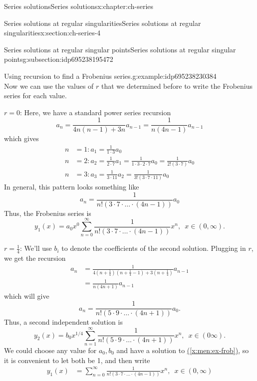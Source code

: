 \documentclass[oneside,10pt,]{book}
\newcommand{\xreffont}{\relax}
\numberwithin{equation}{section}
\numberwithin{equation}{section}
\newcommand{\amp}{&}
\begin{document}
\begin{chapterptx}{Series solutions}{}{Series solutions}{}{}{x:chapter:ch-series}
\begin{sectionptx}{Series solutions at regular singularities}{}{Series solutions at regular singularities}{}{}{x:section:ch-series-4}
\begin{subsectionptx}{Series solutions at regular singular points}{}{Series solutions at regular singular points}{}{}{g:subsection:idp695238195472}
\begin{example}{Using recursion to find a Frobenius series.}{g:example:idp695238230384}
\begin{equation*}
\end{equation*}
Now we can use the values of \(r\) that we determined before to write the Frobenius series for each value.%
\par
\(r = 0\): Here, we have a standard power series recursion%
\begin{equation*}
a_n = \frac{1}{4n(n-1) + 3n} a_{n-1} = \frac{1}{n(4n - 1)} a_{n-1}
\end{equation*}
which gives%
\begin{align*}
n \amp= 1: a_1 = \frac{1}{1 \cdot3 } a_0\\
n\amp =2: a_2 = \frac{1}{2 \cdot 7}a_1 = \frac{1}{1 \cdot 3 \cdot 2 \cdot 7}a_0 = \frac{1}{2! (3 \cdot 7)}a_0\\
n\amp = 3: a_3 = \frac{1}{3 \cdot 11} a_2 =  \frac{1}{3!(3 \cdot 7 \cdot 11)} a_0
\end{align*}
In general, this pattern looks something like%
\begin{equation*}
a_n = \frac{1}{n! (3 \cdot 7 \cdot \ldots \cdot (4n -1))} a_0
\end{equation*}
Thus, the Frobenius series is%
\begin{equation*}
y_1(x) = a_0 x^0 \sum_{n=0}^\infty \frac{1}{n! (3 \cdot 7 \cdot \ldots \cdot (4n -1))} x^n, \,\,\, x \in (0, \infty).
\end{equation*}
%
\par
\(r = \frac{1}{4}\): We'll use \(b_i\) to denote the coefficients of the second solution. Plugging in \(r\), we get the recursion%
\begin{align*}
a_n \amp= \frac{1}{4(n+\frac{1}{4})(n+\frac{1}{4} - 1) + 3(n+ \frac{1}{4})} a_{n-1}\\
\amp= \frac{1}{n(4n+1)} a_{n-1}
\end{align*}
which will give%
\begin{equation*}
a_n = \frac{1}{n!(5 \cdot 9 \cdot \ldots \cdot (4n + 1))} a_0.
\end{equation*}
Thus, a second independent solution is%
\begin{equation*}
y_2(x) = b_0 x^{1/4} \sum_{n=1}^\infty \frac{1}{n!(5 \cdot 9 \cdot \ldots \cdot (4n + 1))} x^n, \,\,\, x \in (0\infty).
\end{equation*}
We could choose any value for \(a_0, b_0\) and have a solution to \hyperref[x:men:ex-frob]{({\xreffont\ref{x:men:ex-frob}})}, so it is convenient to let both be 1, and then write%
\begin{align*}
y_1(x) \amp= \sum_{n=0}^\infty \frac{1}{n! (3 \cdot 7 \cdot \ldots \cdot(4n -1))} x^n, \,\,\, x \in (0, \infty)\\

\end{align*}
\end{example}
\end{subsectionptx}
\end{sectionptx}
\end{chapterptx}
\end{document}

